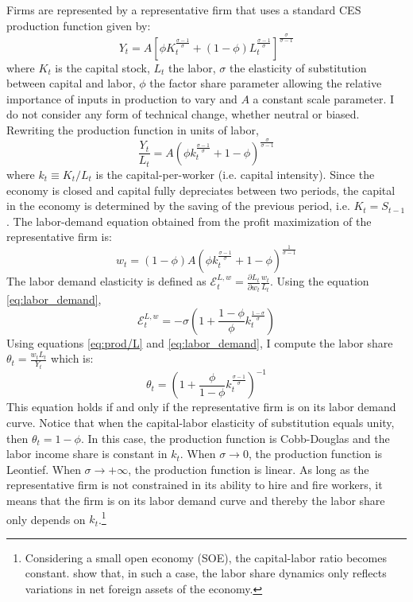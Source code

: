 Firms are represented by a representative firm that uses a standard CES production function given by:
	\begin{equation}\label{eq:prod}
	Y_t = A\left[ \phi K_t^{\frac{\sigma - 1}{\sigma}} + (1-\phi) L_t^{\frac{\sigma - 1}{\sigma}}\right]^{\frac{\sigma}{\sigma-1}}
	\end{equation}
where $K_t$ is the capital stock, $L_t$ the labor, $\sigma$ the elasticity of substitution between capital and labor, $\phi$ the factor share parameter allowing the relative importance of inputs in production to vary and $A$ a constant scale parameter. I do not consider any form of technical change, whether neutral or biased. Rewriting the production function in units of labor,
	\begin{equation}\label{eq:prod/L}
	\frac{Y_t}{L_t} = A\left(\phi k_t^{\frac{\sigma-1}{\sigma}} + 1-\phi\right)^{\frac{\sigma}{\sigma-1}}
	\end{equation}
where $k_t\equiv K_t/L_t$ is the capital-per-worker (i.e. capital intensity). Since the economy is closed and capital fully depreciates between two periods, the capital in the economy is determined by the saving of the previous period, i.e. $K_t = S_{t-1}$. The labor-demand equation obtained from the profit maximization of the representative firm is:
	\begin{equation}\label{eq:labor_demand}
	w_t = (1-\phi)A\left(\phi k_t^{\frac{\sigma-1}{\sigma}}+1-\phi\right)^{\frac{1}{\sigma-1}}
	\end{equation}
The labor demand elasticity is defined as $\mathcal{E}^{L,w}_t=\frac{\partial L_t}{\partial w_t}\frac{w_t}{L_t}$. Using the equation \eqref{eq:labor_demand},
	\begin{equation}\label{eq:labor_elasticity}
	\mathcal{E}^{L,w}_t = -\sigma\left(1+\frac{1-\phi}{\phi}k_t^{\frac{1-\sigma}{\sigma}}\right)
	\end{equation}
Using equations \eqref{eq:prod/L} and \eqref{eq:labor_demand}, I compute the labor share $\theta_t = \frac{w_tL_t}{Y_t}$ which is:
	\begin{equation}\label{eq:theta}
	\theta_t = \left(1+\frac{\phi}{1-\phi}k_t^{\frac{\sigma-1}{\sigma}}\right)^{-1}
	\end{equation}
This equation holds if and only if the representative firm is on its labor demand curve. Notice that when the capital-labor elasticity of substitution equals unity, then $\theta_t=1-\phi$. In this case, the production function is Cobb-Douglas and the labor income share is constant in $k_t$.  When $\sigma \to 0$, the production function is Leontief. When $\sigma \to +\infty$, the production function is linear. 
As long as the representative firm is not constrained in its ability to hire and fire workers, it means that the firm is on its labor demand curve and thereby the labor share only depends on $k_t$.\footnote{Considering a small open economy (SOE), the capital-labor ratio becomes constant. \cite{Schmidt2013} show that, in such a case, the labor share dynamics only reflects variations in net foreign assets of the economy.}

